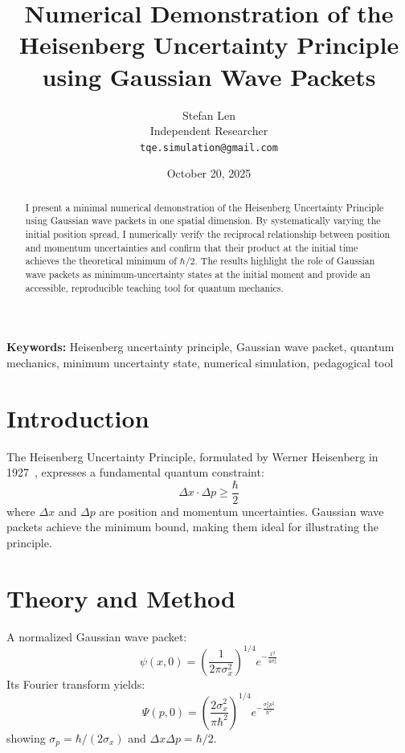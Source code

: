 \documentclass[12pt]{article}
\title{Numerical Demonstration of the Heisenberg Uncertainty Principle using Gaussian Wave Packets}
\author{Stefan Len \\ Independent Researcher \\ \texttt{tqe.simulation@gmail.com}}
\date{October 20, 2025}
\begin{document}
\maketitle

\begin{abstract}
I present a minimal numerical demonstration of the Heisenberg Uncertainty Principle using Gaussian wave packets in one spatial dimension. By systematically varying the initial position spread, I numerically verify the reciprocal relationship between position and momentum uncertainties and confirm that their product at the initial time achieves the theoretical minimum of $\hbar/2$. The results highlight the role of Gaussian wave packets as minimum-uncertainty states at the initial moment and provide an accessible, reproducible teaching tool for quantum mechanics.
\end{abstract}

\textbf{Keywords:} Heisenberg uncertainty principle, Gaussian wave packet, quantum mechanics, minimum uncertainty state, numerical simulation, pedagogical tool

\section{Introduction}
The Heisenberg Uncertainty Principle, formulated by Werner Heisenberg in 1927~\cite{heisenberg1927}, expresses a fundamental quantum constraint:
\[
\Delta x \cdot \Delta p \ge \frac{\hbar}{2}
\]
where $\Delta x$ and $\Delta p$ are position and momentum uncertainties. Gaussian wave packets achieve the minimum bound, making them ideal for illustrating the principle.

\section{Theory and Method}
A normalized Gaussian wave packet:
\[
\psi(x,0) = \left(\frac{1}{2\pi\sigma_x^2}\right)^{1/4} e^{-\frac{x^2}{4\sigma_x^2}}
\]
Its Fourier transform yields:
\[
\Psi(p,0) = \left(\frac{2\sigma_x^2}{\pi\hbar^2}\right)^{1/4} e^{-\frac{\sigma_x^2 p^2}{\hbar^2}}
\]
showing $\sigma_p = \hbar / (2\sigma_x)$ and $\Delta x \Delta p = \hbar/2$.
\end{document}
